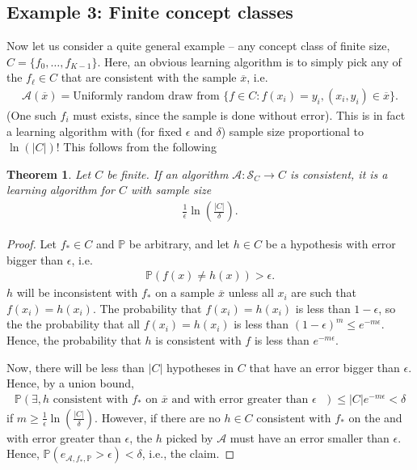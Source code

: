 \documentclass{article}
\newcommand{\calA}{\mathcal{A}}
\newcommand{\calS}{\mathcal{S}}
\newtheorem{theorem}{Theorem}
\newcommand{\abs}[1]{\vert #1 \vert}
\begin{document}
\subsection{Example 3: Finite concept classes} 
Now let us consider a quite general example -- any concept class of finite size, $C= \{f_0, \dots, f_{K-1}\}$. Here, an obvious learning algorithm is to simply pick any of the $f_\ell\in C$ that are consistent with the sample $\overline{x}$, i.e. 
\begin{align*}
    \calA(\overline{x}) = \text{Uniformly random draw from } \{f \in C : f(x_i) = y_i, (x_i,y_i)\in\overline{x}\}.
\end{align*}
(One such $f_i$ must exists, since the sample is done without error). This is in fact a learning algorithm with (for fixed $\epsilon$ and $\delta$) sample size proportional to $\ln(\abs{C})$! This follows from the following
   \begin{theorem}
        Let $C$ be finite. If an algorithm $\calA: \calS_C \to C$ is consistent, it is a learning algorithm for $C$ with sample size 
        \begin{align*}
             \tfrac{1}{\epsilon} \ln \left(\frac{\abs{C}}{\delta}\right).
        \end{align*}
    \end{theorem}
    \begin{proof}
        Let $f_*\in C$ and $\mathbb{P}$ be arbitrary, and let $h\in C$ be a hypothesis with error bigger than $\epsilon$, i.e.
        \begin{align*}
            \mathbb{P}(f(x)\neq h(x))>\epsilon.
        \end{align*}
        $h$ will be inconsistent with $f_*$ on a sample $\overline{x}$ unless all $x_i$ are such that $f(x_i)=h(x_i)$. The probability that $f(x_i)=h(x_i)$ is less than $1-\epsilon$, so the the probability that all $f(x_i)=h(x_i)$ is less than $(1-\epsilon)^m\leq e^{-m\epsilon}$. Hence, the probability that $h$ is consistent with $f$ is less than $e^{-m\epsilon}$.

        Now, there will be less than $\abs{C}$ hypotheses in $C$ that have an error bigger than $\epsilon$. Hence, by a union bound,
        \begin{align*}
            \mathbb{P}(\exists, h \text{ consistent with $f_*$ on $\overline{x}$ and with error greater than $\epsilon$ }) \leq \abs{C}e^{-m\epsilon}<\delta
        \end{align*}
        if $m \geq \tfrac{1}{\epsilon} \ln \left(\frac{\abs{C}}{\delta}\right)$. However, if there are no $h\in C$  consistent with $f_*$ on the and with error greater than $\epsilon$, the $h$ picked by $\calA$ must have an error smaller than $\epsilon$. Hence, $\mathbb{P}(e_{\calA,f_*,\mathbb{P}}>\epsilon)<\delta$, i.e., the claim. 
    \end{proof}
\end{document}
